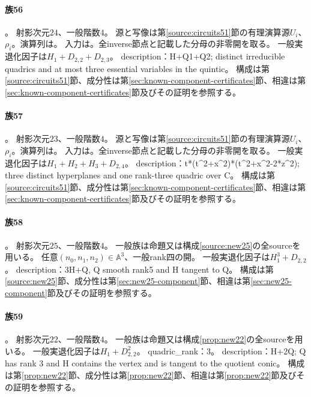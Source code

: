 \paragraph{族56}\label{catalogue:R4_CPLUS_EXT}
。
射影次元$24$、一般階数$4$。
源と写像は第\ref{source:circuits51}節の有理演算源$U_i$、$\rho_i$。演算列は。
入力は。全inverse節点と記載した分母の非零開を取る。
一般実退化因子は$H_{1}+D_{2,2}+D_{2,3}$。
description：H+Q1+Q2; distinct irreducible quadrics and at most three essential variables in the quintic。
構成は第\ref{source:circuits51}節、成分性は第\ref{sec:known-component-certificates}節、相違は第\ref{sec:known-component-certificates}節及びその証明を参照する。

\paragraph{族57}\label{catalogue:R4_CMINUS_MAG}
。
射影次元$23$、一般階数$4$。
源と写像は第\ref{source:circuits51}節の有理演算源$U_i$、$\rho_i$。演算列は。
入力は。全inverse節点と記載した分母の非零開を取る。
一般実退化因子は$H_{1}+H_{2}+H_{3}+D_{2,4}$。
description：t*(t\textasciicircum{}2+x\textasciicircum{}2)*(t\textasciicircum{}2+x\textasciicircum{}2-2*z\textasciicircum{}2); three distinct hyperplanes and one rank-three quadric over C。
構成は第\ref{source:circuits51}節、成分性は第\ref{sec:known-component-certificates}節、相違は第\ref{sec:known-component-certificates}節及びその証明を参照する。

\paragraph{族58}\label{catalogue:R4_POSITIVE_WEIGHT6_25}
。
射影次元$25$、一般階数$4$。
一般族は命題又は構成\ref{source:new25}の全sourceを用いる。
任意$(n_0,n_1,n_2)\in\mathbb A^3$、一般rank四の開。
一般実退化因子は$H_{1}^{3}+D_{2,2}$。
description：3H+Q, Q smooth rank5 and H tangent to Q。
構成は第\ref{source:new25}節、成分性は第\ref{sec:new25-component}節、相違は第\ref{sec:new25-component}節及びその証明を参照する。

\paragraph{族59}\label{catalogue:R4_DOUBLE_RANK3_QUADRIC_MIXED_22}
。
射影次元$22$、一般階数$4$。
一般族は命題又は構成\ref{prop:new22}の全sourceを用いる。
一般実退化因子は$H_{1}+D_{2,2}^{2}$。
quadric\_rank：3。
description：H+2Q; Q has rank 3 and H contains the vertex and is tangent to the quotient conic。
構成は第\ref{prop:new22}節、成分性は第\ref{prop:new22}節、相違は第\ref{prop:new22}節及びその証明を参照する。

